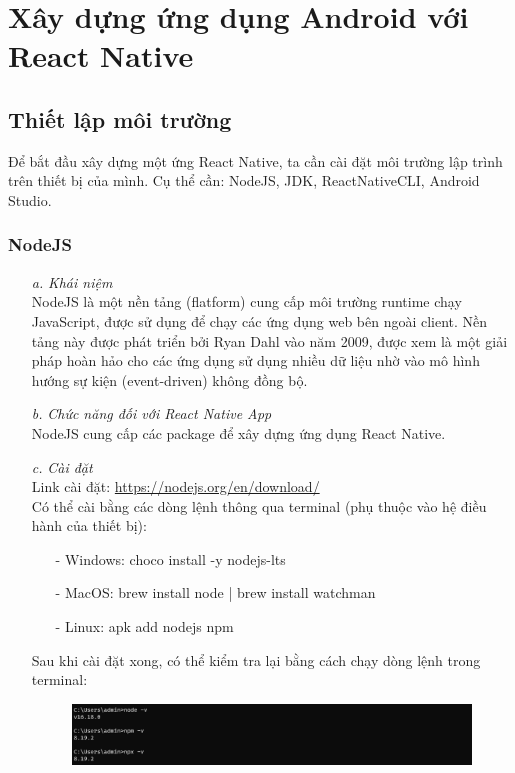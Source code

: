 \section{Xây dựng ứng dụng Android với React Native}

\subsection{Thiết lập môi trường}
Để bắt đầu xây dựng một ứng React Native, ta cần cài đặt môi trường lập trình trên thiết bị của mình. Cụ thể cần: NodeJS, JDK, ReactNativeCLI, Android Studio.
\subsubsection{NodeJS}
\begin{enumerate}
    \item[\textit{a.}] {\textit{Khái niệm}}\\
    NodeJS là một nền tảng (flatform) cung cấp môi trường runtime chạy JavaScript, được sử dụng để chạy các ứng dụng web bên ngoài client. Nền tảng này được phát triển bởi Ryan Dahl vào năm 2009, được xem là một giải pháp hoàn hảo cho các ứng dụng sử dụng nhiều dữ liệu nhờ vào mô hình hướng sự kiện (event-driven) không đồng bộ.
    \item[\textit{b.}] {\textit{Chức năng đối với React Native App}}\\
    NodeJS cung cấp các package để xây dựng ứng dụng React Native.
    \item[\textit{c.}] {\textit{Cài đặt}}\\
    Link cài đặt: \url{https://nodejs.org/en/download/}\\
    Có thể cài bằng các dòng lệnh thông qua terminal (phụ thuộc vào hệ điều hành của thiết bị):
    \begin{enumerate}
        \item[-] {Windows}: choco install -y nodejs-lts
        \item[-] {MacOS}: brew install node | brew install watchman
        \item[-] {Linux}: apk add nodejs npm
    \end{enumerate}
    Sau khi cài đặt xong, có thể kiểm tra lại bằng cách chạy dòng lệnh trong terminal:
    \begin{figure}[!ht]
        \centering
        \includegraphics[scale=0.5]{images/checkNodeJS.png}
    \end{figure}
\end{enumerate}
